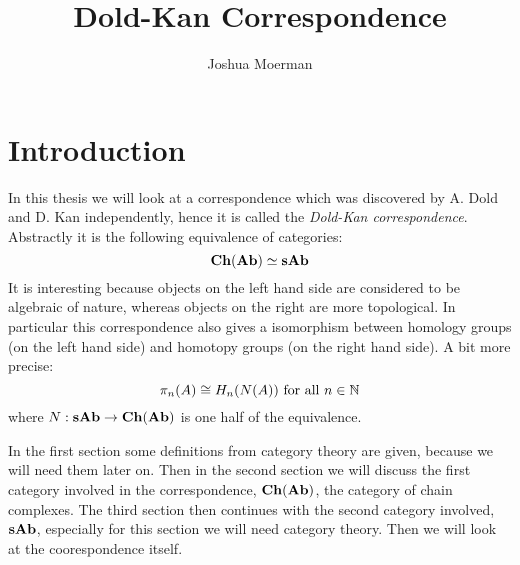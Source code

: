 \documentclass[12pt]{amsproc}
\title{Dold-Kan Correspondence}
\author{Joshua Moerman}
\theoremstyle{plain}
\theoremstyle{definition}
\begin{document}
\maketitle

\section*{Introduction}
In this thesis we will look at a correspondence which was discovered by A. Dold and D. Kan independently, hence it is called the \emph{Dold-Kan correspondence}. Abstractly it is the following equivalence of categories:
$$ \mathbf{Ch}(\mathbf{Ab}) \simeq \mathbf{sAb} $$
It is interesting because objects on the left hand side are considered to be algebraic of nature, whereas objects on the right are more topological. In particular this correspondence also gives a isomorphism between homology groups (on the left hand side) and homotopy groups (on the right hand side). A bit more precise:
$$ \pi_n(A) \cong H_n(N(A)) \text{ for all } n \in \mathbb{N} $$
where $N: \mathbf{sAb} \to \mathbf{Ch}(\mathbf{Ab})$ is one half of the equivalence.

In the first section some definitions from category theory are given, because we will need them later on. Then in the second section we will discuss the first category involved in the correspondence, $\mathbf{Ch}(\mathbf{Ab})$, the category of chain complexes. The third section then continues with the second category involved, $\mathbf{sAb}$, especially for this section we will need category theory. Then we will look at the coorespondence itself.

\newpage


\newpage


\newpage


\newpage


\newpage
\listoftodos
% 
% 	
\end{document}
